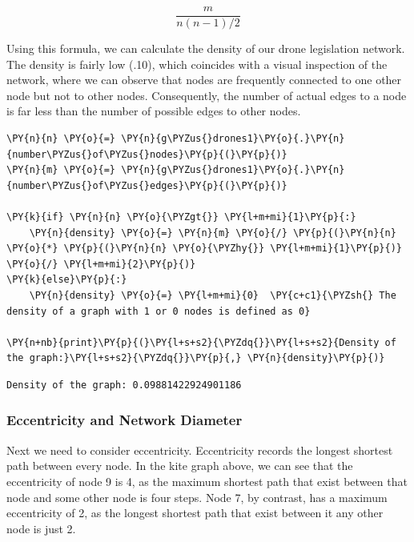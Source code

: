 \[ \frac{m}{n(n-1)/2} \]

    Using this formula, we can calculate the density of our drone
legislation network. The density is fairly low (.10), which coincides
with a visual inspection of the network, where we can observe that nodes
are frequently connected to one other node but not to other nodes.
Consequently, the number of actual edges to a node is far less than the
number of possible edges to other nodes.

    \begin{tcolorbox}[breakable, size=fbox, boxrule=1pt, pad at break*=1mm,colback=cellbackground, colframe=cellborder]
\begin{Verbatim}[commandchars=\\\{\}]
\PY{n}{n} \PY{o}{=} \PY{n}{g\PYZus{}drones1}\PY{o}{.}\PY{n}{number\PYZus{}of\PYZus{}nodes}\PY{p}{(}\PY{p}{)}
\PY{n}{m} \PY{o}{=} \PY{n}{g\PYZus{}drones1}\PY{o}{.}\PY{n}{number\PYZus{}of\PYZus{}edges}\PY{p}{(}\PY{p}{)}

\PY{k}{if} \PY{n}{n} \PY{o}{\PYZgt{}} \PY{l+m+mi}{1}\PY{p}{:}
    \PY{n}{density} \PY{o}{=} \PY{n}{m} \PY{o}{/} \PY{p}{(}\PY{n}{n} \PY{o}{*} \PY{p}{(}\PY{n}{n} \PY{o}{\PYZhy{}} \PY{l+m+mi}{1}\PY{p}{)} \PY{o}{/} \PY{l+m+mi}{2}\PY{p}{)}
\PY{k}{else}\PY{p}{:}
    \PY{n}{density} \PY{o}{=} \PY{l+m+mi}{0}  \PY{c+c1}{\PYZsh{} The density of a graph with 1 or 0 nodes is defined as 0}

\PY{n+nb}{print}\PY{p}{(}\PY{l+s+s2}{\PYZdq{}}\PY{l+s+s2}{Density of the graph:}\PY{l+s+s2}{\PYZdq{}}\PY{p}{,} \PY{n}{density}\PY{p}{)}
\end{Verbatim}
\end{tcolorbox}

    \begin{Verbatim}[commandchars=\\\{\}]
Density of the graph: 0.09881422924901186
    \end{Verbatim}

    \hypertarget{eccentricity-and-network-diameter}{%
\subsubsection{Eccentricity and Network
Diameter}\label{eccentricity-and-network-diameter}}

Next we need to consider eccentricity. Eccentricity records the longest
shortest path between every node. In the kite graph above, we can see
that the eccentricity of node 9 is 4, as the maximum shortest path that
exist between that node and some other node is four steps. Node 7, by
contrast, has a maximum eccentricity of 2, as the longest shortest path
that exist between it any other node is just 2.

